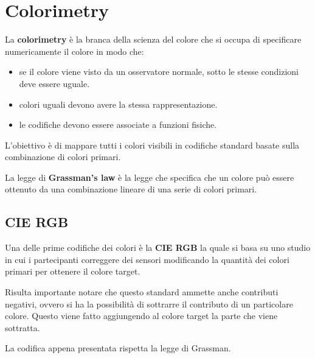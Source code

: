 \section{Colorimetry}
\begin{definizione}[Colorimetry]
    La \textbf{colorimetry} è la branca della scienza del colore che si occupa
    di specificare numericamente il colore in modo che:
    \begin{itemize}
        \item se il colore viene visto da un osservatore normale, sotto le stesse
              condizioni deve essere uguale.
        \item colori uguali devono avere la stessa rappresentazione.
        \item le codifiche devono essere associate a funzioni fisiche.
    \end{itemize}
\end{definizione}

L'obiettivo è di mappare tutti i colori visibili in codifiche standard basate sulla
combinazione di colori primari.

\begin{definizione}
    La legge di \textbf{Grassman's law} è la legge che specifica che un colore può
    essere ottenuto da una combinazione lineare di una serie di colori primari.
\end{definizione}

\subsection{CIE RGB}
Una delle prime codifiche dei colori è la \textbf{CIE RGB} la quale si basa su
uno studio in cui i partecipanti correggere dei sensori modificando la quantità
dei colori primari per ottenere il colore target.

Risulta importante notare che questo standard ammette anche contributi negativi,
ovvero si ha la possibilità di sottrarre il contributo di un particolare colore.
Questo viene fatto aggiungendo al colore target la parte che viene sottratta.
\begin{nota}
    La codifica appena presentata rispetta la legge di Grassman.
\end{nota}
